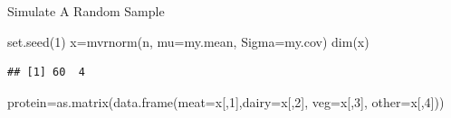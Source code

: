 \documentclass[
  ignorenonframetext,
]{beamer}
\newenvironment{Shaded}{\begin{snugshade}}{\end{snugshade}}
\newcommand{\AttributeTok}[1]{\textcolor[rgb]{0.77,0.63,0.00}{#1}}
\newcommand{\DecValTok}[1]{\textcolor[rgb]{0.00,0.00,0.81}{#1}}
\newcommand{\FunctionTok}[1]{\textcolor[rgb]{0.00,0.00,0.00}{#1}}
\newcommand{\NormalTok}[1]{#1}
\newcommand{\OtherTok}[1]{\textcolor[rgb]{0.56,0.35,0.01}{#1}}
\begin{document}
\begin{frame}[fragile]{Simulate A Random Sample}
\protect\hypertarget{simulate-a-random-sample}{}
\begin{Shaded}
\begin{Highlighting}[]
\FunctionTok{set.seed}\NormalTok{(}\DecValTok{1}\NormalTok{)}
\NormalTok{x}\OtherTok{=}\FunctionTok{mvrnorm}\NormalTok{(n, }\AttributeTok{mu=}\NormalTok{my.mean, }\AttributeTok{Sigma=}\NormalTok{my.cov)}
\FunctionTok{dim}\NormalTok{(x)}
\end{Highlighting}
\end{Shaded}

\begin{verbatim}
## [1] 60  4
\end{verbatim}

\begin{Shaded}
\begin{Highlighting}[]
\NormalTok{protein}\OtherTok{=}\FunctionTok{as.matrix}\NormalTok{(}\FunctionTok{data.frame}\NormalTok{(}\AttributeTok{meat=}\NormalTok{x[,}\DecValTok{1}\NormalTok{],}\AttributeTok{dairy=}\NormalTok{x[,}\DecValTok{2}\NormalTok{], }
                             \AttributeTok{veg=}\NormalTok{x[,}\DecValTok{3}\NormalTok{], }\AttributeTok{other=}\NormalTok{x[,}\DecValTok{4}\NormalTok{]))}
\end{Highlighting}
\end{Shaded}
\end{frame}
\end{document}
